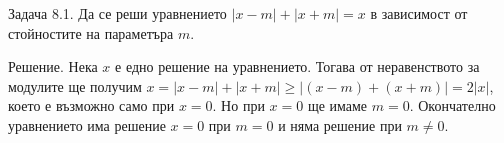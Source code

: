
Задача 8.1. Да се реши уравнението $|x-m|+|x+m|=x$ в зависимост от стойностите на параметъра $m$.

Решение. Нека $x$ е едно решение на уравнението. Тогава от неравенството за модулите ще получим $x=|x-m|+|x+m| \geq|(x-m)+(x+m)|=2|x|$, което е възможно само при $x=0$. Но при $x=0$ ще имаме $m=0$. Окончателно уравнението има решение $x=0$ при $m=0$ и няма решение при $m \neq 0$.
